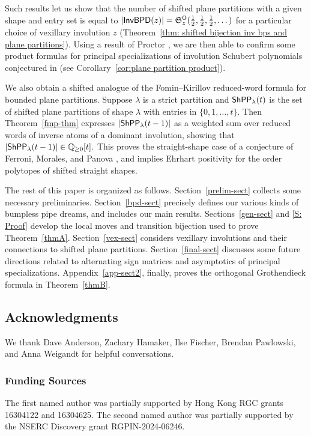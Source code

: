 \documentclass[10pt]{article}
\begin{document}
Such results let us show that the number of shifted plane partitions
with a given shape and entry set 
is equal to $|\mathsf{InvBPD}(z)| = \mathfrak S^{\mathsf{O}}_z(\frac{1}{2},\frac{1}{2},\frac{1}{2},\dots)$
for a particular choice of  vexillary involution $z$
(Theorem~\ref{thm: shifted bijection inv bps and plane partitions}).
Using a result of Proctor \cite{Proctor}, we are then able to confirm some product formulas
for principal specializations of involution Schubert polynomials conjectured in \cite{HMP6} (see Corollary~\ref{cor:plane partition product}).


We also obtain a shifted analogue of the Fomin--Kirillov reduced-word formula for bounded plane partitions. Suppose $\lambda$ is a strict partition and $\mathsf{ShPP}_{\lambda}(t)$ is the set of shifted plane partitions of shape $\lambda$ with entries in $\{0,1,\ldots,t\}$. Then Theorem~\ref{fmp-thm} expresses $|\mathsf{ShPP}_{\lambda}(t-1)|$ as a weighted sum over reduced words of inverse atoms of a dominant involution, showing that
$
|\mathsf{ShPP}_{\lambda}(t-1)|\in \mathbb{Q}_{\geq0}[t].
$
This proves the straight-shape case of a conjecture of Ferroni, Morales, and Panova \cite[Conj.~7.10]{FMP}, and implies Ehrhart positivity for the order polytopes of shifted straight shapes.



The rest of this paper is organized as follows.
Section~\ref{prelim-sect} collects some necessary preliminaries. Section~\ref{bpd-sect} precisely defines our various kinds of bumpless pipe dreams, and includes our main results. Sections~\ref{gen-sect} and \ref{S: Proof} develop the local moves and transition bijection used to prove Theorem~\ref{thmA}. Section~\ref{vex-sect} considers vexillary involutions and their connections to shifted plane partitions. Section~\ref{final-sect} discusses some future directions related to alternating sign matrices and asymptotics of principal specializations. Appendix~\ref{app-sect2}, finally, proves the orthogonal Grothendieck formula in Theorem~\ref{thmB}.

\subsection*{Acknowledgments}

We thank Dave Anderson, Zachary Hamaker, Ilse Fischer, Brendan Pawlowski, and Anna Weigandt
for helpful conversations.

\subsubsection*{Funding Sources}
The first named author was partially supported by Hong Kong RGC grants 16304122 and 16304625. The second named author was partially supported by the NSERC Discovery grant RGPIN-2024-06246.
\end{document}
